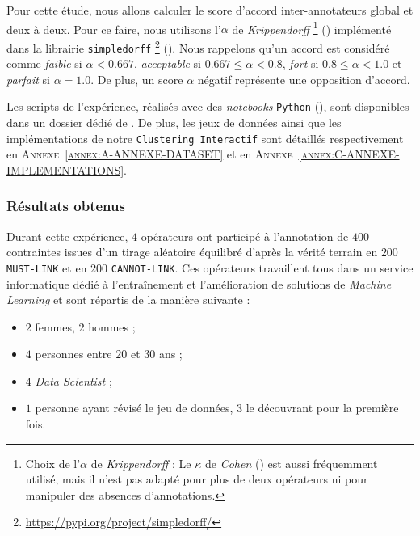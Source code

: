 			Pour cette étude, nous allons calculer le score d'accord inter-annotateurs global et deux à deux.
			Pour ce faire, nous utilisons l'$\alpha$ de \textit{Krippendorff} \footnote{
				Choix de l'$\alpha$ de \textit{Krippendorff} : Le $\kappa$ de \textit{Cohen} (\cite{landis-koch:1977:measurement-observer-agreement}) est aussi fréquemment utilisé, mais il n'est pas adapté pour plus de deux opérateurs ni pour manipuler des absences d'annotations.
			} (\cite{krippendorff:2004:content-analysis-introduction}) implémenté dans la librairie \texttt{simpledorff} \footnote{
				\url{https://pypi.org/project/simpledorff/}
			} (\cite{perry:2021:lighttag-text-annotation}).
			Nous rappelons qu'un accord est considéré comme \textit{faible} si $\alpha<0.667$, \textit{acceptable} si $0.667 \leq \alpha<0.8$, \textit{fort} si $0.8 \leq \alpha<1.0$ et \textit{parfait} si $\alpha = 1.0$.
			De plus, un score $\alpha$ négatif représente une opposition d'accord.
			
			\begin{leftBarInformation}
				Les scripts de l'expérience, réalisés avec des \textit{notebooks} \texttt{Python} (\cite{van-rossum-drake:2009:python-reference-manual}), sont disponibles dans un dossier dédié de \cite{schild:2021:cognitivefactory-interactiveclusteringcomparativestudy}.
				De plus, les jeux de données ainsi que les implémentations de notre \texttt{Clustering Interactif} sont détaillés respectivement en \textsc{Annexe~\ref{annex:A-ANNEXE-DATASET}} et en \textsc{Annexe~\ref{annex:C-ANNEXE-IMPLEMENTATIONS}}.
			\end{leftBarInformation}
			
		\subsubsection{Résultats obtenus}
		
			Durant cette expérience, $4$ opérateurs ont participé à l'annotation de $400$ contraintes issues d'un tirage aléatoire équilibré d'après la vérité terrain en $200$ \texttt{MUST-LINK} et en $200$ \texttt{CANNOT-LINK}.
			Ces opérateurs travaillent tous dans un service informatique dédié à l'entraînement et l'amélioration de solutions de \textit{Machine Learning} et sont répartis de la manière suivante :
			\begin{itemize}
				\item $2$ femmes, $2$ hommes ;
				\item $4$ personnes entre $20$ et $30$ ans ;
				\item $4$ \textit{Data Scientist} ;
				\item $1$ personne ayant révisé le jeu de données, $3$ le découvrant pour la première fois.
			\end{itemize}
		

